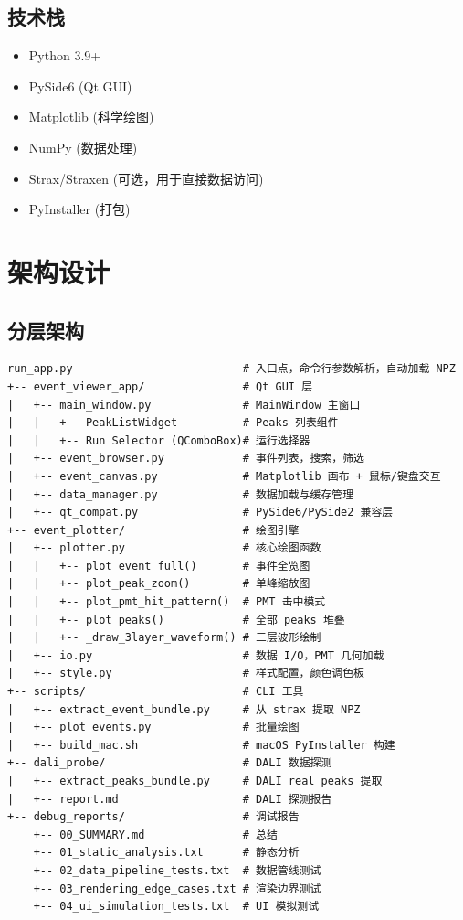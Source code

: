 \documentclass[12pt,a4paper]{article}
\begin{document}
\subsection{技术栈}

\begin{itemize}[itemsep=2pt]
\item Python 3.9+
\item PySide6 (Qt GUI)
\item Matplotlib (科学绘图)
\item NumPy (数据处理)
\item Strax/Straxen (可选，用于直接数据访问)
\item PyInstaller (打包)
\end{itemize}

\section{架构设计}

\subsection{分层架构}

\begin{lstlisting}[language=text]
run_app.py                          # 入口点，命令行参数解析，自动加载 NPZ
+-- event_viewer_app/               # Qt GUI 层
|   +-- main_window.py              # MainWindow 主窗口
|   |   +-- PeakListWidget          # Peaks 列表组件
|   |   +-- Run Selector (QComboBox)# 运行选择器
|   +-- event_browser.py            # 事件列表，搜索，筛选
|   +-- event_canvas.py             # Matplotlib 画布 + 鼠标/键盘交互
|   +-- data_manager.py             # 数据加载与缓存管理
|   +-- qt_compat.py                # PySide6/PySide2 兼容层
+-- event_plotter/                  # 绘图引擎
|   +-- plotter.py                  # 核心绘图函数
|   |   +-- plot_event_full()       # 事件全览图
|   |   +-- plot_peak_zoom()        # 单峰缩放图
|   |   +-- plot_pmt_hit_pattern()  # PMT 击中模式
|   |   +-- plot_peaks()            # 全部 peaks 堆叠
|   |   +-- _draw_3layer_waveform() # 三层波形绘制
|   +-- io.py                       # 数据 I/O，PMT 几何加载
|   +-- style.py                    # 样式配置，颜色调色板
+-- scripts/                        # CLI 工具
|   +-- extract_event_bundle.py     # 从 strax 提取 NPZ
|   +-- plot_events.py              # 批量绘图
|   +-- build_mac.sh                # macOS PyInstaller 构建
+-- dali_probe/                     # DALI 数据探测
|   +-- extract_peaks_bundle.py     # DALI real peaks 提取
|   +-- report.md                   # DALI 探测报告
+-- debug_reports/                  # 调试报告
    +-- 00_SUMMARY.md               # 总结
    +-- 01_static_analysis.txt      # 静态分析
    +-- 02_data_pipeline_tests.txt  # 数据管线测试
    +-- 03_rendering_edge_cases.txt # 渲染边界测试
    +-- 04_ui_simulation_tests.txt  # UI 模拟测试
\end{lstlisting}
\end{document}
